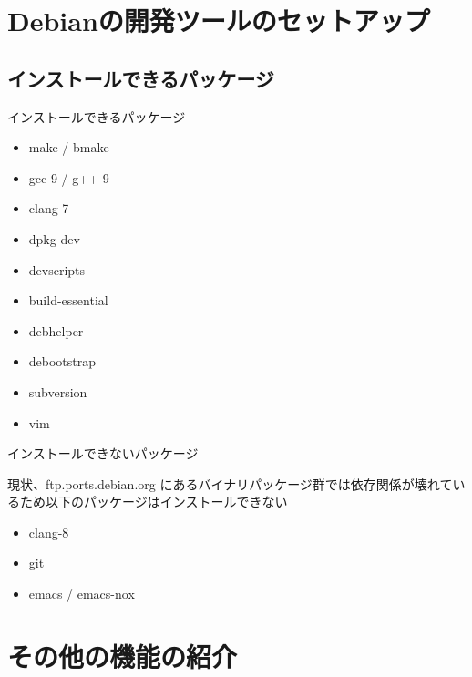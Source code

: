 \section{Debianの開発ツールのセットアップ}

\subsection{インストールできるパッケージ}
\begin{frame}[containsverbatim]{インストールできるパッケージ}

\begin{itemize}
\item make / bmake
\item gcc-9 / g++-9
\item clang-7
\item dpkg-dev
\item devscripts
\item build-essential
\item debhelper
\item debootstrap
\item subversion
\item vim
\end{itemize}

\end{frame}

\begin{frame}[containsverbatim]{インストールできないパッケージ}

現状、ftp.ports.debian.org にあるバイナリパッケージ群では依存関係が壊れているため以下のパッケージはインストールできない

\begin{itemize}
\item clang-8
\item git
\item emacs / emacs-nox
\end{itemize}

\end{frame}


\section{その他の機能の紹介}

